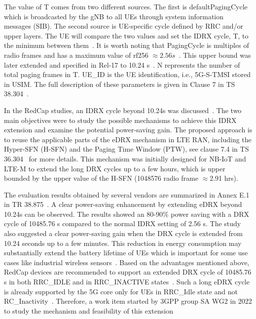 \documentclass[]{IEEEtran}
\begin{document}
The value of T comes from two different sources.
The first is defaultPagingCycle which is broadcasted by the gNB to all UEs through system information messages (SIB).
The second source is UE-specific cycle defined by RRC and/or upper layers.
The UE will compare the two values and set the IDRX cycle, T, to the minimum between them~\cite{kumar2021analytical}.
It is worth noting that PagingCycle is multiples of radio frames and has a maximum value of rf256 $\approx2.56 s$~\cite{3gpp_nr_nodate-3_38.331}.
This upper bound was later extended and specified in Rel-17 to 10.24 s~\cite{3gpp_nr_nodate-3_38.331}.
N represents the number of total paging frames in T.
UE\_ID is the UE identification, i.e., 5G-S-TMSI stored in USIM.
The full description of these parameters is given in Clause 7 in TS 38.304~\cite{3gpp_nr_2022-10_38.304}.

In the RedCap studies, an IDRX cycle beyond  10.24s was discussed~\cite{ratasuk_reduced_2021}. 
The two main objectives were to study the possible mechanisms to achieve this IDRX extension and examine the potential power-saving gain.
The proposed approach is to reuse the applicable parts of the eDRX mechanism in LTE RAN, including the Hyper-SFN (H-SFN) and the Paging Time Window (PTW), see clause 7.4 in TS 36.304~\cite{TS_36.304} for more details. 
This mechanism was initially designed for NB-IoT and LTE-M to extend the long DRX cycles up to a few hours, which is upper bounded by the upper value of the H-SFN (1048576 radio frame $\approx$2.91 hrs).

The evaluation results obtained by several vendors are summarized in Annex E.1 in TR 38.875~\cite{3gpp_study_2021_38.875}.
A clear power-saving enhancement by extending eDRX beyond 10.24s can be observed.
The results showed an 80-90\% power saving with a DRX cycle of 10485.76 s compared to the normal IDRX setting of 2.56 s.
The study also suggested a clear power-saving gain when the DRX cycle is extended from 10.24 seconds up to a few minutes. 
This reduction in energy consumption may substantially extend the battery lifetime of UEs which is important for some use cases like industrial wireless sensors~\cite{veedu_toward_2022_arXiv:2203.05634}.
Based on the advantages mentioned above, RedCap devices are recommended to support an extended DRX cycle of 10485.76 s in both RRC\_IDLE and in RRC\_INACTIVE states~\cite{3gpp_study_2021_38.875}.
Such a long eDRX cycle is already supported by the 5G core only for UEs in RRC\_Idle state and not RC\_Inactivity~\cite{veedu_toward_2022_arXiv:2203.05634}.
Therefore, a work item started by 3GPP group SA WG2 in 2022 to study the mechanism and feasibility of this extension~\cite{3gpp_5gs_2022_SP-220803}
\end{document}
